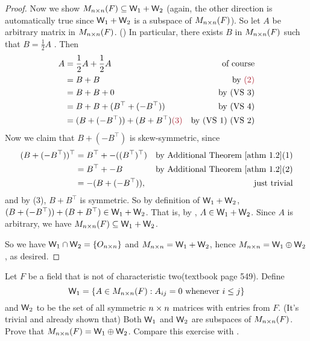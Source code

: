 \begin{proof}
Now we show \(M_{n \times n}(F) \subseteq \textsf{W}_1 + \textsf{W}_2\) (again, the other direction is automatically true since \(\textsf{W}_1 + \textsf{W}_2\) is a subspace of \(M_{n \times n}(F)\)).
So let \(A\) be arbitrary matrix in \(M_{n \times n}(F)\).
()
In particular, there exists \(B\) in \(M_{n \times n}(F)\) such that \(B = \frac1{2} A\) .
Then
\begin{align*}
    A & = \frac1{2} A + \frac1{2} A & \text{of course} \\
      & = B + B & \text{by \MAROON{(2)}} \\
      & = B + B + 0 & \text{by (VS 3)} \\
      & = B + B + (B^\top + (-B^\top)) & \text{by (VS 4)} \\
      & = (B + (-B^\top)) + (B + B^\top) \MAROON{(3)}  & \text{by (VS 1) (VS 2)}
\end{align*}
Now we claim that \(B + (-B^\top)\) is skew-symmetric, since
\begin{align*}
    (B + (-B^\top))^\top & = B^\top + -((B^\top)^\top) & \text{by \ATHM{1.2}(1)} \\
                   & = B^\top + -B & \text{by \ATHM{1.2}(2)} \\
                   & = -(B + (-B^\top)), & \text{just trivial}
\end{align*}
and by (3), \(B + B^\top\) is symmetric.
So by definition of \(\textsf{W}_1 + \textsf{W}_2\), \((B + (-B^\top)) + (B + B^\top) \in \textsf{W}_1 + \textsf{W}_2\).
That is, by , \(A \in \textsf{W}_1 + \textsf{W}_2\).
Since \(A\) is arbitrary, we have \(M_{n \times n}(F) \subseteq \textsf{W}_1 + \textsf{W}_2\).

So we have \(\textsf{W}_1 \cap \textsf{W}_2 = \{ O_{n \times n} \}\) and \(M_{n \times n} = \textsf{W}_1 + \textsf{W}_2\), hence \(M_{n \times n} = \textsf{W}_1 \oplus \textsf{W}_2\), as desired.
\end{proof}

\begin{exercise} \label{exercise 1.3.29}
Let \(F\) be a field that is not of characteristic two(textbook page 549).
Define
\[
    \textsf{W}_1 = \{ A \in M_{n \times n}(F) : A_{ij} = 0 \text{ whenever } i \le j \}
\]
and \(\textsf{W}_2\) to be the set of all symmetric \(n \times n\) matrices with entries from \(F\).
(It's trivial and already shown that) Both \(\textsf{W}_1\) and \(\textsf{W}_2\) are subspaces of \(M_{n \times n}(F)\).
Prove that \(M_{n \times n}(F) = \textsf{W}_1 \oplus \textsf{W}_2\).
Compare this exercise with .
\end{exercise}

